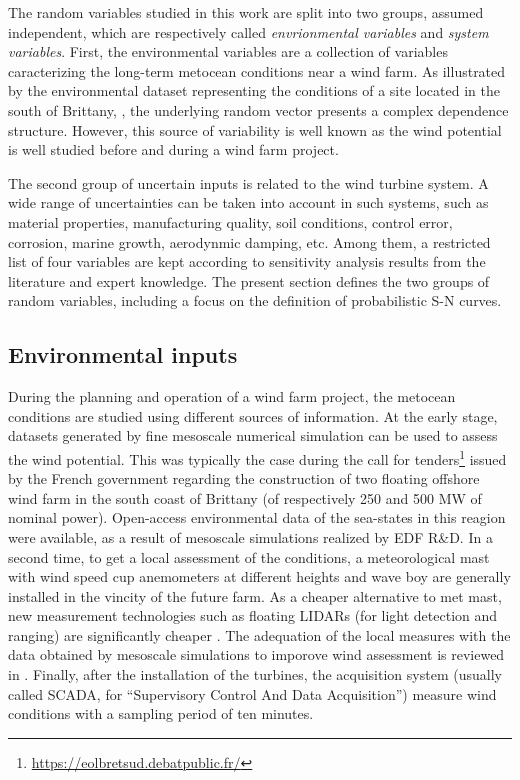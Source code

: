 The random variables studied in this work are split into two groups, assumed independent, which are respectively called \textit{envrionmental variables} and \textit{system variables}. 
First, the environmental variables are a collection of variables caracterizing the long-term metocean conditions near a wind farm. 
As illustrated by the environmental dataset representing the conditions of a site located in the south of Brittany, , the underlying random vector presents a complex dependence structure. 
However, this source of variability is well known as the wind potential is well studied before and during a wind farm project.   

The second group of uncertain inputs is related to the wind turbine system. 
A wide range of uncertainties can be taken into account in such systems, such as material properties, manufacturing quality, soil conditions, control error, corrosion, marine growth, aerodynmic damping, etc.  
Among them, a restricted list of four variables are kept according to sensitivity analysis results from the literature and expert knowledge. 
The present section defines the two groups of random variables, including a focus on the definition of probabilistic S-N curves. 


\subsection{Environmental inputs}


During the planning and operation of a wind farm project, the metocean conditions are studied using different sources of information. 
At the early stage, datasets generated by fine mesoscale numerical simulation can be used to assess the wind potential. 
This was typically the case during the call for tenders\footnote{\url{https://eolbretsud.debatpublic.fr/}} issued by the French government regarding the construction of two floating offshore wind farm in the south coast of Brittany (of respectively 250 and 500 MW of nominal power). 
Open-access environmental data of the sea-states in this reagion were available, as a result of mesoscale simulations \citep{raoult_2018_anemoc3} realized by EDF R\&D.    
In a second time, to get a local assessment of the conditions, a meteorological mast with wind speed cup anemometers at different heights and wave boy are generally installed in the vincity of the future farm. 
As a cheaper alternative to met mast, new measurement technologies such as floating LIDARs (for light detection and ranging) are significantly cheaper \citep{gottschall_2017_floating_LIDAR}. 
The adequation of the local measures with the data obtained by mesoscale simulations  to imporove wind assessment is reviewed in \citet{sempreviva_2008_wind_assessment_review}.  
Finally, after the installation of the turbines, the acquisition system (usually called SCADA, for ``Supervisory Control And Data Acquisition'') measure wind conditions with a sampling period of ten minutes. 

